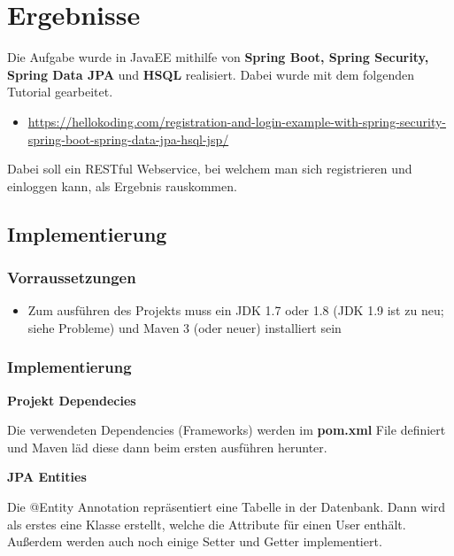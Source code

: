 
\section{Ergebnisse}
\label{sec:Ergebnisse}
Die Aufgabe wurde in JavaEE mithilfe von \textbf{Spring Boot, Spring Security, Spring Data JPA} und \textbf{HSQL} realisiert. Dabei wurde mit dem folgenden Tutorial gearbeitet.

\begin{itemize}
	\item \href{https://hellokoding.com/registration-and-login-example-with-spring-security-spring-boot-spring-data-jpa-hsql-jsp/}{https://hellokoding.com/registration-and-login-example-with-spring-security-spring-boot-spring-data-jpa-hsql-jsp/}
\end{itemize}

Dabei soll ein RESTful Webservice, bei welchem man sich registrieren und einloggen kann, als Ergebnis rauskommen.

\subsection{Implementierung}
\subsubsection{Vorraussetzungen}

\begin{itemize}
	\item Zum ausführen des Projekts muss ein JDK 1.7 oder 1.8 (JDK 1.9 ist zu neu; siehe Probleme) und Maven 3 (oder neuer) installiert sein
\end{itemize}

\subsubsection{Implementierung}
\item \textbf{Projekt Dependecies}

Die verwendeten Dependencies (Frameworks) werden im \textbf{pom.xml} File definiert und Maven läd diese dann beim ersten ausführen herunter.

\item \textbf{JPA Entities}

Die @Entity Annotation repräsentiert eine Tabelle in der Datenbank.
Dann wird als erstes eine Klasse erstellt, welche die Attribute für einen User enthält. Außerdem werden auch noch einige Setter und Getter implementiert.

